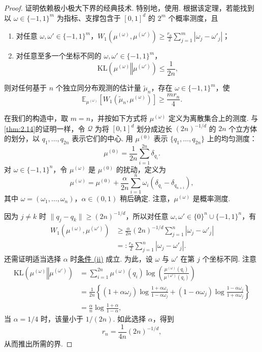 \begin{proof}
证明依赖极小极大下界的经典技术. 特别地，使用\cite[定理2.12]{ref302}. 根据该定理，若能找到以 $\omega\in\{-1,1\}^m$ 为指标、支撑包含于 $[0,1]^d$ 的 $2^m$ 个概率测度，且
\begin{enumerate}
\item[(i)]\label{item:2.15.i} 对任意 $\omega,\omega'\in\{-1,1\}^m$，$W_1(\mu^{(\omega)},\mu^{(\omega')})\ge\frac{r_n}2\sum_{j=1}^m|\omega_j-\omega'_j|$；
\item[(ii)]\label{item:2.15.ii} 对任意至多一个坐标不同的 $\omega,\omega'\in\{-1,1\}^m$，
$$\mathrm{KL}(\mu^{(\omega)}\mathbin\Vert\mu^{(\omega')})\le\frac1{2n},$$
\end{enumerate}
则对任何基于 $n$ 个独立同分布观测的估计量 $\tilde\mu_n$，存在 $\omega\in\{-1,1\}^m$，使
$$\mathbb E_{\mu^{(\omega)}}[W_1(\tilde\mu_n,\mu^{(\omega)})]\ge\frac{mr_n}4.$$

在我们的构造中，取 $m=n$，并按如下方式将 $\mu^{(\omega)}$ 定义为离散集合上的测度. 与\autoref{thm:2.14}的证明一样，令 $\mathcal Q$ 为将 $[0,1]^d$ 划分成边长 $(2n)^{-1/d}$ 的 $2n$ 个立方体的划分，以 $q_1,\ldots,q_{2n}$ 表示它们的中心. 用 $\mu^{(0)}$ 表示 $\{q_1,\ldots,q_{2n}\}$ 上的均匀测度：
$$\mu^{(0)}=\frac1{2n}\sum_{i=1}^{2n}\delta_{q_i}.$$
对 $\omega\in\{-1,1\}^n$，令 $\mu^{(\omega)}$ 是 $\mu^{(0)}$ 的扰动，定义为
$$\mu^{(\omega)}=\mu^{(0)}+\frac\alpha{2n}\sum_{i=1}^n\omega_i(\delta_{q_i}-\delta_{q_{n+i}}),$$
其中 $\omega=(\omega_1,\ldots,\omega_n)$，$\alpha\in(0,1)$ 稍后确定. 注意，$\mu^{(\omega)}$ 是概率测度.

因为 $j\ne k$ 时 $\lVert q_j-q_k\rVert\ge(2n)^{-1/d}$，所以对任意 $\omega,\omega'\in\{0\}^n\cup\{-1,1\}^n$，有
$$\begin{aligned}
W_1(\mu^{(\omega)},\mu^{(\omega')})
&\ge\frac\alpha{2n}(2n)^{-1/d}\sum_{j=1}^n|\omega_j-\omega'_j|\\
&=:\frac{r_n}2\sum_{j=1}^n|\omega_j-\omega'_j|.
\end{aligned}$$
还需证明适当选择 $\alpha$ 时\hyperref[item:2.15.ii]{条件 (ii)} 成立. 为此，设 $\omega$ 与 $\omega'$ 在第 $j$ 个坐标不同. 注意
$$\begin{aligned}
\mathrm{KL}(\mu^{(\omega)}\mathbin\Vert\mu^{(\omega')})
&=\sum_{i=1}^{2n}\mu^{(\omega)}(q_i)\log\left(\frac{\mu^{(\omega)}(q_i)}{\mu^{(\omega')}(q_i)}\right)\\
&=\frac1{2n}\left\{(1+\alpha\omega_j)\log\frac{1+\alpha\omega_j}{1-\alpha\omega_j}
+(1-\alpha\omega_j)\log\frac{1-\alpha\omega_j}{1+\alpha\omega_j}\right\}\\
&=\frac\alpha n\log\frac{1+\alpha}{1-\alpha},
\end{aligned}$$
当 $\alpha=1/4$ 时，该量小于 $1/(2n)$. 如此选择 $\alpha$，得到
\begin{equation}\label{eq:2.14}
r_n=\frac1{4n}(2n)^{-1/d},
\end{equation}
从而推出所需的界.
\end{proof}
